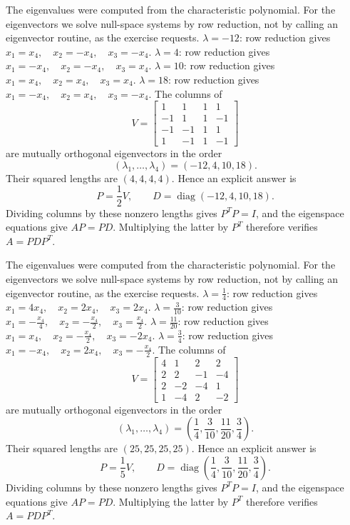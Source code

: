 The eigenvalues were computed from the characteristic polynomial. For
the eigenvectors we solve null-space systems by row reduction, not by
calling an eigenvector routine, as the exercise requests.
$\lambda=-12$: row reduction gives \(x_{1}=x_{4},\quad x_{2}=- x_{4},\quad x_{3}=- x_{4}\).
$\lambda=4$: row reduction gives \(x_{1}=- x_{4},\quad x_{2}=- x_{4},\quad x_{3}=x_{4}\).
$\lambda=10$: row reduction gives \(x_{1}=x_{4},\quad x_{2}=x_{4},\quad x_{3}=x_{4}\).
$\lambda=18$: row reduction gives \(x_{1}=- x_{4},\quad x_{2}=x_{4},\quad x_{3}=- x_{4}\).
The columns of
\[
 V=\begin{bmatrix}1&1&1&1\\-1&1&1&-1\\-1&-1&1&1\\1&-1&1&-1\end{bmatrix}
\]
are mutually orthogonal eigenvectors in the order
\[
 (\lambda_1,\ldots,\lambda_4)=(-12,4,10,18).
\]
Their squared lengths are $(4,4,4,4)$. Hence an explicit answer is
\[
 P=\frac1{2}V,\qquad
 D=\operatorname{diag}(-12,4,10,18).
\]
Dividing columns by these nonzero lengths gives $P^TP=I$, and the
eigenspace equations give $AP=PD$. Multiplying the latter by $P^T$
therefore verifies $A=PDP^T$.

The eigenvalues were computed from the characteristic polynomial. For
the eigenvectors we solve null-space systems by row reduction, not by
calling an eigenvector routine, as the exercise requests.
$\lambda=\frac{1}{4}$: row reduction gives \(x_{1}=4 x_{4},\quad x_{2}=2 x_{4},\quad x_{3}=2 x_{4}\).
$\lambda=\frac{3}{10}$: row reduction gives \(x_{1}=- \frac{x_{4}}{4},\quad x_{2}=- \frac{x_{4}}{2},\quad x_{3}=\frac{x_{4}}{2}\).
$\lambda=\frac{11}{20}$: row reduction gives \(x_{1}=x_{4},\quad x_{2}=- \frac{x_{4}}{2},\quad x_{3}=- 2 x_{4}\).
$\lambda=\frac{3}{4}$: row reduction gives \(x_{1}=- x_{4},\quad x_{2}=2 x_{4},\quad x_{3}=- \frac{x_{4}}{2}\).
The columns of
\[
 V=\begin{bmatrix}4&1&2&2\\2&2&-1&-4\\2&-2&-4&1\\1&-4&2&-2\end{bmatrix}
\]
are mutually orthogonal eigenvectors in the order
\[
 (\lambda_1,\ldots,\lambda_4)=(\frac{1}{4},\frac{3}{10},\frac{11}{20},\frac{3}{4}).
\]
Their squared lengths are $(25,25,25,25)$. Hence an explicit answer is
\[
 P=\frac1{5}V,\qquad
 D=\operatorname{diag}(\frac{1}{4},\frac{3}{10},\frac{11}{20},\frac{3}{4}).
\]
Dividing columns by these nonzero lengths gives $P^TP=I$, and the
eigenspace equations give $AP=PD$. Multiplying the latter by $P^T$
therefore verifies $A=PDP^T$.

